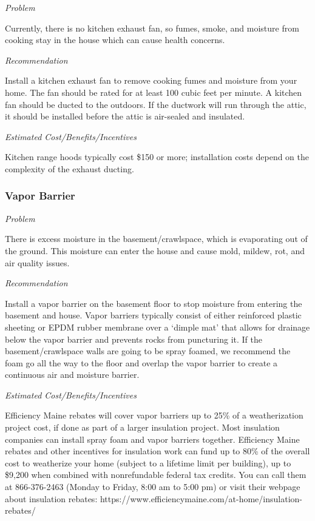 \documentclass[
  letterpaper,
  DIV=11,
  numbers=noendperiod]{scrartcl}
\begin{document}
\emph{Problem}

Currently, there is no kitchen exhaust fan, so fumes, smoke, and
moisture from cooking stay in the house which can cause health concerns.

\emph{Recommendation}

Install a kitchen exhaust fan to remove cooking fumes and moisture from
your home. The fan should be rated for at least 100 cubic feet per
minute. A kitchen fan should be ducted to the outdoors. If the ductwork
will run through the attic, it should be installed before the attic is
air-sealed and insulated.

\emph{Estimated Cost/Benefits/Incentives}

Kitchen range hoods typically cost \$150 or more; installation costs
depend on the complexity of the exhaust ducting.

\subsubsection{Vapor Barrier}\label{vapor-barrier}

\emph{Problem}

There is excess moisture in the basement/crawlspace, which is
evaporating out of the ground. This moisture can enter the house and
cause mold, mildew, rot, and air quality issues.

\emph{Recommendation}

Install a vapor barrier on the basement floor to stop moisture from
entering the basement and house. Vapor barriers typically consist of
either reinforced plastic sheeting or EPDM rubber membrane over a
`dimple mat' that allows for drainage below the vapor barrier and
prevents rocks from puncturing it. If the basement/crawlspace walls are
going to be spray foamed, we recommend the foam go all the way to the
floor and overlap the vapor barrier to create a continuous air and
moisture barrier.

\emph{Estimated Cost/Benefits/Incentives}

Efficiency Maine rebates will cover vapor barriers up to 25\% of a
weatherization project cost, if done as part of a larger insulation
project. Most insulation companies can install spray foam and vapor
barriers together. Efficiency Maine rebates and other incentives for
insulation work can fund up to 80\% of the overall cost to weatherize
your home (subject to a lifetime limit per building), up to \$9,200 when
combined with nonrefundable federal tax credits. You can call them at
866-376-2463 (Monday to Friday, 8:00 am to 5:00 pm) or visit their
webpage about insulation rebates:
https://www.efficiencymaine.com/at-home/insulation-rebates/
\end{document}
